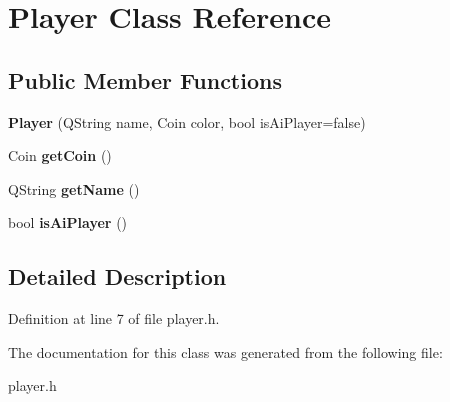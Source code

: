 \hypertarget{class_player}{\section{Player Class Reference}
\label{class_player}
}
\subsection*{Public Member Functions}
\begin{DoxyCompactItemize}
\item 
\hypertarget{class_player_a877063d8943797400d52fe2735d521c3}{{\bfseries Player} (Q\-String name, Coin color, bool is\-Ai\-Player=false)}\label{class_player_a877063d8943797400d52fe2735d521c3}

\item 
\hypertarget{class_player_a60bab4053f47b075a4228b5237394711}{Coin {\bfseries get\-Coin} ()}\label{class_player_a60bab4053f47b075a4228b5237394711}

\item 
\hypertarget{class_player_ade0334ac0e87ac1c5e09ce78f2cafd83}{Q\-String {\bfseries get\-Name} ()}\label{class_player_ade0334ac0e87ac1c5e09ce78f2cafd83}

\item 
\hypertarget{class_player_a0f345ac8c69275c700ed776ddac094c3}{bool {\bfseries is\-Ai\-Player} ()}\label{class_player_a0f345ac8c69275c700ed776ddac094c3}

\end{DoxyCompactItemize}


\subsection{Detailed Description}


Definition at line 7 of file player.\-h.



The documentation for this class was generated from the following file\-:\begin{DoxyCompactItemize}
\item 
player.\-h\end{DoxyCompactItemize}

